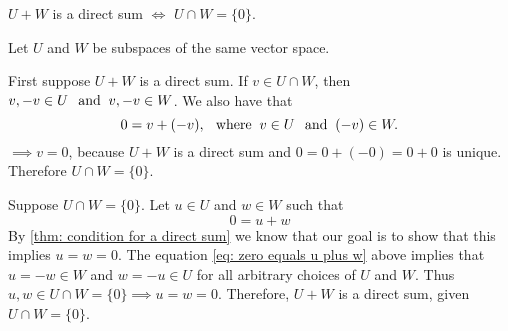 \setcounter{thm}{45}
\begin{thm} 
  \label{thm: sum and intersection of two subspaces}
  $U+W$ is a direct sum $\iff$ $U \cap W = \{0\}$.
\end{thm}
\begin{prf} Let $U$ and $W$ be subspaces of the same vector space.
  \begin{description}
    \item{} First suppose $U+W$ is a direct sum. If $v \in U \cap W$, then $v, -v \in U \;\;\, \text{and}\;\; v, -v \in W$. We also have that
    \begin{equation}
      0 = v + (-v), \;\;\, \text{where}\;\; v\in U \;\;\, \text{and}\;\; (-v) \in W.
    \end{equation}
    $\implies v=0$, because $U+W$  is a direct sum and $0 = 0+(-0)=0+0$ is unique. Therefore $U \cap W = \{0\}$.

    \item{} Suppose $U\cap W = \{0\}$. Let  $u\in U$ and $w \in W$ such that
    \begin{equation}
      \label{eq: zero equals u plus w}
      0 = u+w
    \end{equation}
    By \ref{thm: condition for a direct sum} we know that our goal is to show that this implies $u=w=0$. The equation \eqref{eq: zero equals u plus w} above implies that $u=-w\in W$  and $w=-u \in U$ for all arbitrary choices of $U$ and $W$. Thus $u,w \in U\cap W = \{0\} \implies u=w=0.$ Therefore, $U+W$ is a direct sum, given $U \cap W = \{0\}$.
  \end{description}
  \vspace{-\baselineskip}
\end{prf}
